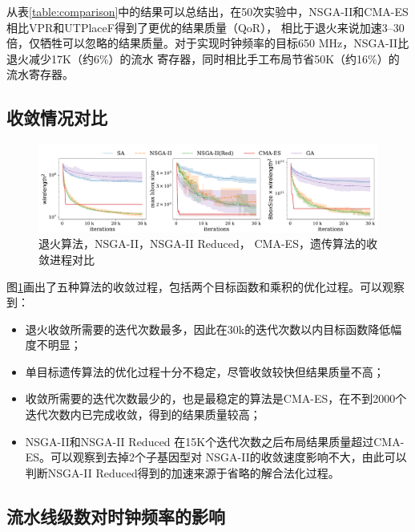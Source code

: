 从表\ref{table:comparison}中的结果可以总结出，在50次实验中，NSGA-II和CMA-ES相比VPR和UTPlaceF得到了更优的结果质量（QoR），
相比于退火来说加速3--30倍，仅牺牲可以忽略的结果质量。对于实现时钟频率的目标650 MHz，NSGA-II比退火减少17K（约6\%）的流水
寄存器，同时相比手工布局节省50K（约16\%）的流水寄存器。


\subsection{收敛情况对比}

\begin{figure}[h]
    \hspace*{-1cm}
	\centering
	\includegraphics[width=1.1\textwidth]{figure/convergence}
	\caption{退火算法，NSGA-II，NSGA-II Reduced， CMA-ES，遗传算法的收敛进程对比} 
	\label{fig:converge}
\end{figure}

图\ref{fig:converge}画出了五种算法的收敛过程，包括两个目标函数和乘积的优化过程。可以观察到：
\begin{itemize}
    \item 退火收敛所需要的迭代次数最多，因此在30k的迭代次数以内目标函数降低幅度不明显；
    \item 单目标遗传算法的优化过程十分不稳定，尽管收敛较快但结果质量不高；
    \item 收敛所需要的迭代次数最少的，也是最稳定的算法是CMA-ES，在不到2000个迭代次数内已完成收敛，得到的结果质量较高；
    \item NSGA-II和NSGA-II Reduced 在15K个迭代次数之后布局结果质量超过CMA-ES。可以观察到去掉2个子基因型对
    NSGA-II的收敛速度影响不大，由此可以判断NSGA-II Reduced得到的加速来源于省略的解合法化过程。
\end{itemize}


\subsection{流水线级数对时钟频率的影响}

